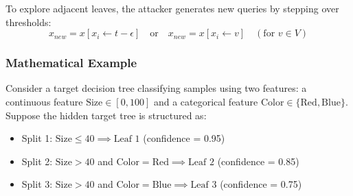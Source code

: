 \documentclass{article}
\begin{document}
To explore adjacent leaves, the attacker generates new queries by stepping over thresholds:
\begin{equation}
    x_{new} = x[x_i \leftarrow t - \epsilon] \quad \text{or} \quad x_{new} = x[x_i \leftarrow v] \quad (\text{for } v \in V)
\end{equation}

\subsubsection{Mathematical Example}
Consider a target decision tree classifying samples using two features: a continuous feature $\text{Size} \in [0, 100]$ and a categorical feature $\text{Color} \in \{\text{Red}, \text{Blue}\}$. Suppose the hidden target tree is structured as:
\begin{itemize}
    \item Split 1: $\text{Size} \le 40 \implies \text{Leaf 1}$ (confidence = 0.95)
    \item Split 2: $\text{Size} > 40$ and $\text{Color} = \text{Red} \implies \text{Leaf 2}$ (confidence = 0.85)
    \item Split 3: $\text{Size} > 40$ and $\text{Color} = \text{Blue} \implies \text{Leaf 3}$ (confidence = 0.75)
\end{itemize}
\end{document}
